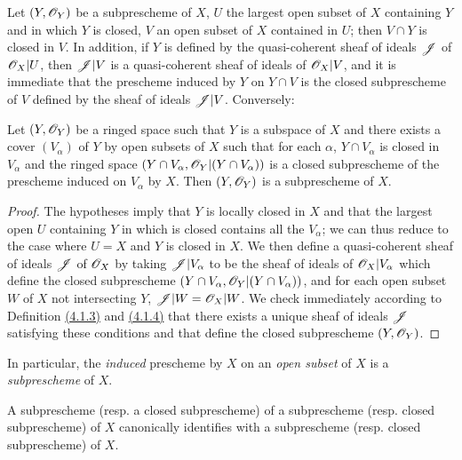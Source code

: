 \begin{env}[4.1.4]
\label{env-1.4.1.4}
Let $(Y,\mathscr{O}_Y)$ be a subprescheme of $X$, $U$ the largest open subset of $X$ containing $Y$
and in which $Y$ is closed, $V$ an open subset of $X$ contained in $U$; then $V\cap Y$ is
closed in $V$. In addition, if $Y$ is defined by the quasi-coherent sheaf of ideals $\mathscr{J}$
of $\mathscr{O}_X|U$, then $\mathscr{J}|V$ is a quasi-coherent sheaf of ideals of $\mathscr{O}_X|V$, and it is
immediate that the prescheme induced by $Y$ on $Y\cap V$ is the closed subprescheme of $V$
defined by the sheaf of ideals $\mathscr{J}|V$. Conversely:
\end{env}

\begin{prop}[4.1.5]
\label{prop-1.4.1.5}
Let $(Y,\mathscr{O}_Y)$ be a ringed space such that $Y$ is a subspace of $X$ and there exists a
cover $(V_\alpha)$ of $Y$ by open subsets of $X$ such that for each $\alpha$,
$Y\cap V_\alpha$ is closed in $V_\alpha$ and the ringed space
$(Y\cap V_\alpha,\mathscr{O}_Y|(Y\cap V_\alpha))$ is a closed subprescheme of the prescheme induced
on $V_\alpha$ by $X$. Then $(Y,\mathscr{O}_Y)$ is a subprescheme of $X$.
\end{prop}

\begin{proof}
\label{proof-prop-1.4.1.5}
The hypotheses imply that $Y$ is locally closed in $X$ and that the largest open $U$
containing $Y$ in which is closed contains all the $V_\alpha$; we can thus reduce to the case
where $U=X$ and $Y$ is closed in $X$. We then define a quasi-coherent sheaf of ideals
$\mathscr{J}$ of $\mathscr{O}_X$ by taking $\mathscr{J}|V_\alpha$ to be the sheaf of ideals of $\mathscr{O}_X|V_\alpha$
which define the closed subprescheme $(Y\cap V_\alpha,\mathscr{O}_Y|(Y\cap V_\alpha))$, and for each
open subset $W$ of $X$ not intersecting $Y$, $\mathscr{J}|W=\mathscr{O}_X|W$. We check immediately
according to Definition \hyperref[defn-1.4.1.3]{(4.1.3)} and \hyperref[env-1.4.1.4]{(4.1.4)}
that there exists a unique sheaf of ideals $\mathscr{J}$ satisfying these conditions and that
define the closed subprescheme $(Y,\mathscr{O}_Y)$.
\end{proof}

In particular, the {\em induced} prescheme by $X$ on an {\em open subset} of $X$ is a
{\em subprescheme} of $X$.

\begin{prop}[4.1.6]
\label{prop-1.4.1.6}
A subprescheme (resp. a closed subprescheme) of a subprescheme
(resp. closed subprescheme) of $X$ canonically identifies with a subprescheme
(resp. closed subprescheme) of $X$.
\end{prop}

